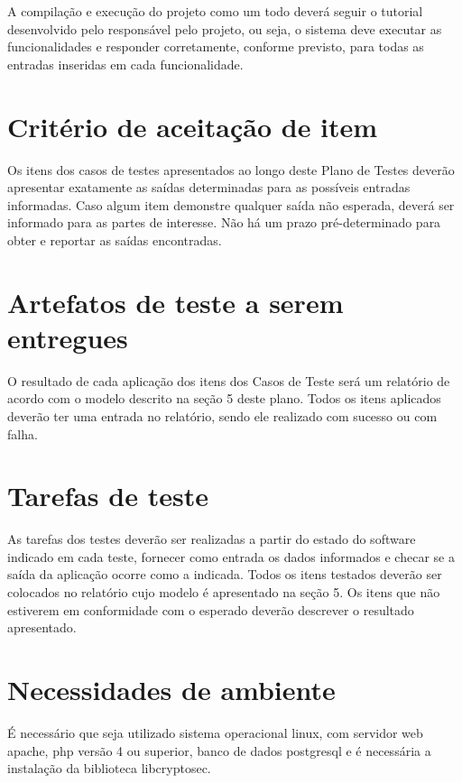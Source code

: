 A compilação e execução do projeto como um todo deverá seguir o tutorial desenvolvido pelo responsável pelo projeto, ou seja, o sistema deve executar as funcionalidades e responder corretamente, conforme previsto, para todas as entradas inseridas em cada funcionalidade.

\section{Critério de aceitação de item}

Os itens dos casos de testes apresentados ao longo deste Plano de Testes deverão apresentar exatamente as saídas determinadas para as possíveis entradas informadas. Caso algum item demonstre qualquer saída não esperada, deverá ser informado para as partes de interesse. Não há um prazo pré-determinado para obter e reportar as saídas encontradas.

\section{Artefatos de teste a serem entregues}

O resultado de cada aplicação dos itens dos Casos de Teste será um relatório de acordo com o modelo descrito na seção 5 deste plano. Todos os itens aplicados deverão ter uma entrada no relatório, sendo ele realizado com sucesso ou com falha.

\section{Tarefas de teste}

As tarefas dos testes deverão ser realizadas a partir do estado do software indicado em cada teste, fornecer como entrada os dados informados e checar se a saída da aplicação ocorre como a indicada.
Todos os itens testados deverão ser colocados no relatório cujo modelo é apresentado na seção 5. Os itens que não estiverem em conformidade com o esperado deverão descrever o resultado apresentado.

\section{Necessidades de ambiente}

É necessário que seja utilizado sistema operacional linux, com servidor web apache, php versão 4 ou superior, banco de dados postgresql e é necessária a instalação da biblioteca libcryptosec.

